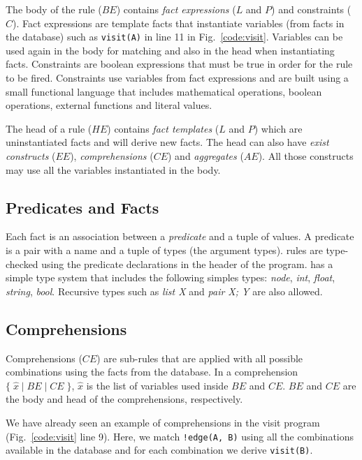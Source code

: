 The body of the rule ($BE$) contains \emph{fact expressions} ($L$ and $P$) and
constraints ($C$). Fact expressions are template facts that instantiate variables
(from facts in the database)
such as \texttt{visit(A)} in line 11 in Fig.~\ref{code:visit}. Variables can be used again in the body for matching and
also in the head when instantiating facts. Constraints are boolean expressions that must
be true in order for the rule to be fired. Constraints use variables from fact expressions and are built using a small functional language that includes mathematical operations, boolean operations, external functions and literal values.

The head of a rule ($HE$) contains \emph{fact templates} ($L$ and $P$) which are uninstantiated facts and will derive new facts. The head can also have \emph{exist constructs} ($EE$), \emph{comprehensions} ($CE$) and \emph{aggregates} ($AE$). All those constructs
may use all the variables instantiated in the body.

\subsection{Predicates and Facts}

Each fact is an association between a \emph{predicate} and a tuple of values. A predicate is a pair with a name and a tuple of types (the argument types). \lang rules are type-checked using the predicate declarations in the header of the program. \lang has a simple type system that includes the following simples types: \emph{node}, \emph{int}, \emph{float}, \emph{string}, \emph{bool}. Recursive types such as \emph{list X} and \emph{pair X; Y} are
also allowed.

\subsection{Comprehensions}


Comprehensions ($CE$) are sub-rules that are applied with all possible combinations using the facts from the database. In a comprehension $\{ \; \widehat{x} \; | \; BE \; | \; CE \; \}$,
$\widehat{x}$ is the list of variables used inside $BE$ and $CE$. $BE$ and $CE$ are the
body and head of the comprehensions, respectively.

We have already seen an example of comprehensions in the visit program (Fig.~\ref{code:visit} line 9).
Here, we match \texttt{!edge(A, B)} using all the combinations
available in the database and for each combination we derive \texttt{visit(B)}.

